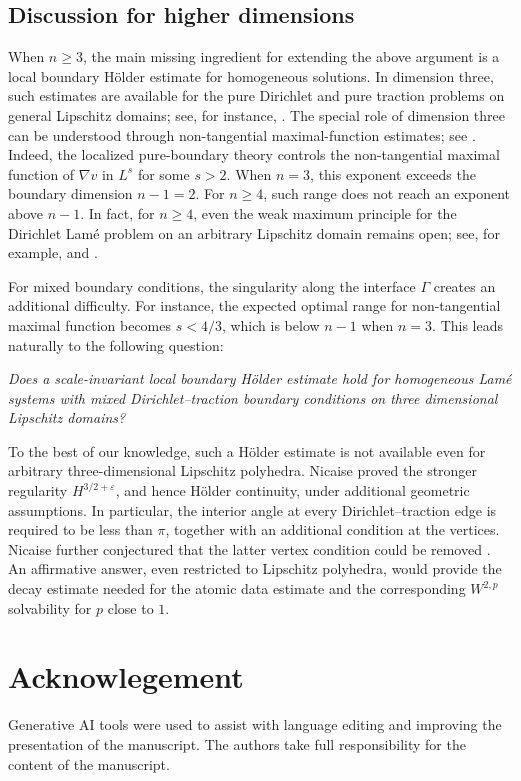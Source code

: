 \documentclass[12pt]{amsart}
\numberwithin{equation}{section}
\begin{document}
\subsection*{Discussion for higher dimensions}

When $n\geq 3$, the main missing ingredient for extending the above argument is a local boundary H\"older estimate for homogeneous solutions. 
In dimension three, such estimates are available for the pure Dirichlet and pure traction problems on general Lipschitz domains; see, for instance, \cite{DahlbergKenigVerchota1988,DahlbergKenig1990}. The special role of dimension three can be understood through non-tangential maximal-function estimates; see \cite{Shen2003Morrey,Shen2006LpDirichlet}.
Indeed, the localized pure-boundary theory controls the non-tangential maximal function of $\nabla v$ in $L^s$ for some $s>2$. When $n=3$, this exponent exceeds the boundary dimension $n-1=2$.
For $n\geq4$, such range does not reach an exponent above $n-1$.
In fact, for $n\geq4$, even the weak maximum principle for the Dirichlet Lam\'e problem on an arbitrary Lipschitz domain remains open; see, for example, \cite[Problem~3.2.38]{MR1282720} and \cite{Shen2006LpDirichlet, Zhuge2020WeakMaximum}.


For mixed boundary conditions, the singularity along the interface $\Gamma$ creates an additional difficulty. For instance, the expected optimal range for non-tangential maximal function becomes $s<4/3$, which is below $n-1$ when $n=3$. This leads naturally to the following question:
\begin{center}
    \textit{Does a scale-invariant local boundary H\"older estimate hold for homogeneous Lam\'e systems with mixed Dirichlet--traction boundary conditions on three dimensional Lipschitz domains?}
\end{center}

To the best of our knowledge, such a H\"older estimate is not available even for arbitrary three-dimensional Lipschitz polyhedra. Nicaise \cite{MR1205404} proved the stronger regularity $H^{3/2+\varepsilon}$, and hence H\"older continuity, under additional geometric assumptions. In particular, the interior angle at every Dirichlet--traction edge is required to be less than $\pi$, together with an additional condition at the vertices. Nicaise further conjectured that the latter vertex condition could be removed \cite[Remark~4.4]{MR1205404}.
An affirmative answer, even restricted to Lipschitz polyhedra, would provide the decay estimate needed for the atomic data estimate and the corresponding $W^{2,p}$ solvability for $p$ close to $1$.


\section*{Acknowlegement}
Generative AI tools were used to assist with language editing and improving the presentation of the manuscript. The authors take full responsibility for the content of the manuscript.




\newcommand{\cprime}{\'}



\end{document}

